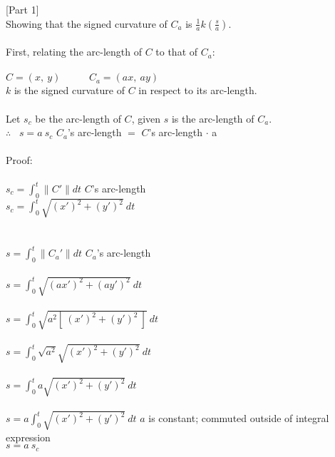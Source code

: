 \documentclass[12pt]{article}
\begin{document}
[Part 1]\\
Showing that the signed curvature of $C_a$ is $\frac{1}{a}k(\frac{s}{a})$.\\
\\
First, relating the arc-length of $C$ to that of $C_a$:\\
\\
$C = (x, \ y) \ \hspace{1cm}\  C_a = (ax, \ ay)$\\
$k$ is the signed curvature of $C$ in respect to its arc-length.\\
\\
Let $s_c$ be the arc-length of $C$, given $s$ is the arc-length of $C_a$. \\
$\therefore$ \  $s = a \ s_c$ \hspace{1cm}\textrm{{\footnotesize $C_a$'s arc-length $=$ $C$'s arc-length $\cdot$ a}}\\
\\
Proof: \\
\\
$s_c = \int_0^t \parallel C' \parallel dt$ \hspace{2cm}\textrm{{\footnotesize $C$'s arc-length}}\\
$s_c = \int_0^t \sqrt{(x')^2 + (y')^2} \ dt$ \\
\\
\\
$s = \int_0^t \parallel C_a' \parallel dt$ \hspace{2cm}\textrm{{\footnotesize $C_a$'s arc-length}}\\
\\
$s = \int_0^t \sqrt{(ax')^2 + (ay')^2} \ dt$ \\
\\
$s = \int_0^t \sqrt{a^2[\ (x')^2 + (y')^2  \ ]} \ dt$ \\
\\
$s = \int_0^t \sqrt{a^2}\sqrt{ (x')^2 + (y')^2  } \ dt$ \\
\\
$s = \int_0^t a \sqrt{ (x')^2 + (y')^2  } \ dt$ \\
\\
$s = a\int_0^t \sqrt{ (x')^2 + (y')^2  } \ dt$ \hspace{1cm}\textrm{{\footnotesize $a$ is constant; commuted outside of integral expression}}\\
$s = a \ s_c$ \\
\end{document}
